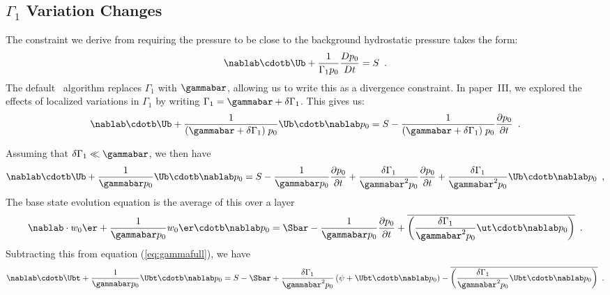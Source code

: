 \subsection{\label{sec:flow:gamma1vary} $\Gamma_1$ Variation Changes}

The constraint we derive from requiring the pressure to be close to
the background hydrostatic pressure takes the form:
\begin{equation}
\nablab \cdotb \Ub + \frac{1}{\Gamma_1 p_0} \frac{Dp_0}{Dt} = S \enskip .
\end{equation}
The default \maestro\ algorithm replaces $\Gamma_1$ with $\gammabar$,
allowing us to write this as a divergence constraint.  In paper~III,
we explored the effects of localized variations in $\Gamma_1$ by
writing $\Gamma_1 = \gammabar + \delta \Gamma_1$.  This gives us:
\begin{equation}
\nablab \cdotb \Ub + \frac{1}{(\gammabar + \delta \Gamma_1) \; p_0} 
  \Ub \cdotb \nablab p_0 = S - \frac{1}{(\gammabar + \delta \Gamma_1) \; p_0} 
  \frac{\partial p_0}{\partial t} \enskip .
\end{equation}

Assuming that $\delta \Gamma_1 \ll \gammabar$, we then have
\begin{equation}
\nablab \cdotb \Ub + \frac{1}{\gammabar p_0} \Ub \cdotb \nablab p_0 = S - \frac{1}{\gammabar p_0} \frac{\partial p_0}{\partial t} +
\frac{\delta \Gamma_1}{\gammabar^2 p_0} \frac{\partial p_0}{\partial t} +
\frac{\delta \Gamma_1}{\gammabar^2 p_0} \Ub \cdotb \nablab p_0 \enskip , \label{eq:gammafull}
\end{equation}
The base state evolution equation is the average of this over a layer
\begin{equation}
\nablab \cdot w_0 \er + \frac{1}{\gammabar p_0} w_0 \er \cdotb \nablab p_0 =
\Sbar - \frac{1}{\gammabar p_0} \frac{\partial p_0}{\partial t} + \overline{
  \left ( \frac{\delta \Gamma_1}{\gammabar^2 p_0} \ut \cdotb \nablab p_0
  \right ) } \enskip .
\end{equation}
Subtracting this from equation (\ref{eq:gammafull}), we have
\begin{equation}
\nablab \cdotb \Ubt + \frac{1}{\gammabar p_0} \Ubt \cdotb \nablab p_0 = S -
\Sbar + \frac{\delta \Gamma_1}{\gammabar^2 p_0} \left (\psi + \Ubt \cdotb
\nablab p_0 \right ) - \overline{ \left ( \frac{\delta \Gamma_1}{\gammabar^2 p_0} \Ubt
\cdotb \nablab p_0 \right ) } \enskip .
\end{equation}

